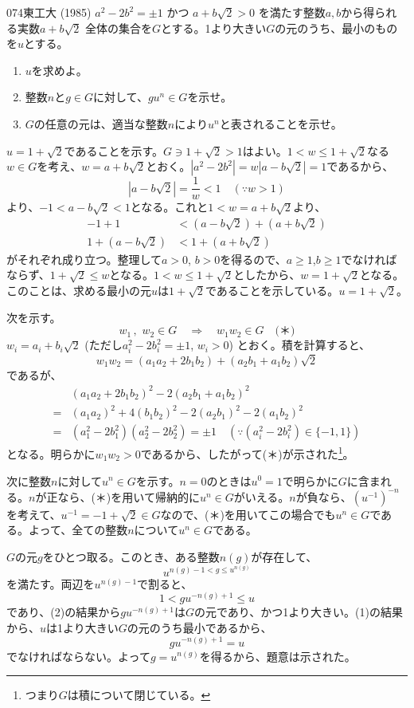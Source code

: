 \begin{prob}{074}{\maru}{東工大 (1985)}
 $a^2-2b^2=\pm 1$ かつ $a+b\sqrt{2}>0$ を満たす整数$a, b$から得られる実数$a+b\sqrt{2}$ 全体の集合を$G$とする。1より大きい$G$の元のうち、最小のものを$u$とする。
 \begin{enumerate}
  \item $u$を求めよ。
  \item 整数$n$と$g\in G$に対して、$gu^n\in G$を示せ。
  \item $G$の任意の元は、適当な整数$n$により$u^n$と表されることを示せ。
 \end{enumerate}
\end{prob}
$u=1+\sqrt{2}$であることを示す。$G\ni 1+\sqrt{2}>1$はよい。$1<w\le 1+\sqrt{2}$なる$w\in G$を考え、$w=a+b\sqrt{2}$とおく。$|a^2-2b^2|=w|a-b\sqrt{2}|=1$であるから、
\[ |a-b\sqrt{2}|=\frac{1}{w}<1 \quad (\because w>1) \]
より、$-1<a-b\sqrt{2}<1$となる。これと$1<w=a+b\sqrt{2}$より、
\begin{align*}
 -1+1&< (a-b\sqrt{2})+(a+b\sqrt{2}) \\
 1+(a-b\sqrt{2})&<1+(a+b\sqrt{2})
\end{align*}
がそれぞれ成り立つ。整理して$a>0$, $b>0$を得るので、$a\ge 1$,$b\ge 1$でなければならず、$1+\sqrt{2}\le w$となる。$1<w\le 1+\sqrt{2}$としたから、$w=1+\sqrt{2}$となる。このことは、求める最小の元$u$は$1+\sqrt{2}$であることを示している。$u=1+\sqrt{2}$。

次を示す。
\[ w_1 \,,\,\, w_2 \in G \quad\Rightarrow\quad w_1w_2\in G \quad\text{(＊)}\]
$w_i=a_i+b_i\sqrt{2}$ (ただし$a_i^2-2b_i^2=\pm 1$, $w_i>0$) とおく。積を計算すると、
\[ w_1w_2=(a_1a_2+2b_1b_2)+(a_2b_1+a_1b_2)\sqrt{2} \]
であるが、
\begin{align*}
 &(a_1a_2+2b_1b_2)^2-2(a_2b_1+a_1b_2)^2 \\
 =& (a_1a_2)^2+4(b_1b_2)^2-2(a_2b_1)^2-2(a_1b_2)^2 \\
 =& (a_1^2-2b_1^2)(a_2^2-2b_2^2)=\pm 1 \quad (\because (a_i^2-2b_i^2)\in\{-1, 1\})
\end{align*}
となる。明らかに$w_1w_2>0$であるから、したがって(＊)が示された\footnote{つまり$G$は積について閉じている。}。

次に整数$n$に対して$u^n\in G$を示す。$n=0$のときは$u^0=1$で明らかに$G$に含まれる。$n$が正なら、(＊)を用いて帰納的に$u^n \in G$がいえる。$n$が負なら、$(u^{-1})^{-n}$を考えて、$u^{-1}=-1+\sqrt{2} \in G$なので、(＊)を用いてこの場合でも$u^n \in G$である。よって、全ての整数$n$について$u^n \in G$である。

$G$の元$g$をひとつ取る。このとき、ある整数$n(g)$が存在して、
\[ u^{n(g)-1 < g \le u^{n(g)}} \]
を満たす。両辺を$u^{n(g)-1}$で割ると、
\[ 1 < g u^{-n(g)+1} \le u \]
であり、(2)の結果から$g u^{-n(g)+1}$は$G$の元であり、かつ1より大きい。(1)の結果から、$u$は1より大きい$G$の元のうち最小であるから、
\[ gu^{-n(g)+1}=u \]
でなければならない。よって$g=u^{n(g)}$を得るから、題意は示された。